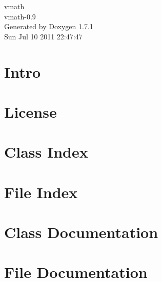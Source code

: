 \documentclass[a4paper]{book}
\begin{document}
\hypersetup{pageanchor=false}
\begin{titlepage}
\vspace*{7cm}
\begin{center}
{\Large vmath \\[1ex]\large vmath-\/0.9 }\\
\vspace*{1cm}
{\large Generated by Doxygen 1.7.1}\\
\vspace*{0.5cm}
{\small Sun Jul 10 2011 22:47:47}\\
\end{center}
\end{titlepage}
\clearemptydoublepage
{}
\tableofcontents
\clearemptydoublepage
{}
\hypersetup{pageanchor=true}
\chapter{Intro}
\label{index}\hypertarget{index}{}
\chapter{License}
\label{license}
\hypertarget{license}{}

\chapter{Class Index}

\chapter{File Index}

\chapter{Class Documentation}






\chapter{File Documentation}


\printindex
\end{document}
